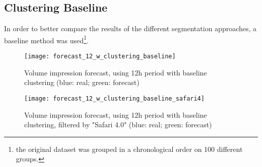 \subsection*{Clustering Baseline}

In order to better compare the results of the different segmentation approaches,
a baseline method was used\footnote{the original dataset was grouped in a
chronological order on 100 different groups.}.

\begin{figure}[!ht]
\centering
\begin{minipage}[t]{0.45\linewidth}
\texttt{[image: forecast\_12\_w\_clustering\_baseline]} \caption[Volume
impression forecast, safari 4, baseline clustering]{Volume impression
forecast, using 12h period with baseline clustering  (blue: real; green: forecast)}
\label{fig:vol_safari_12h_w_clustering_baseline}
\end{minipage}
\quad
\begin{minipage}[t]{0.45\linewidth}
\texttt{[image: forecast\_12\_w\_clustering\_baseline\_safari4]} \caption[Volume
impression forecast, safari 4, baseline clustering, filtered]{Volume impression
forecast, using 12h period with baseline clustering, filtered by "Safari 4.0" (blue: real; green: forecast)}
\label{fig:vol_safari_12h_w_clustering_baseline_safari_4}
\end{minipage}

\end{figure}

